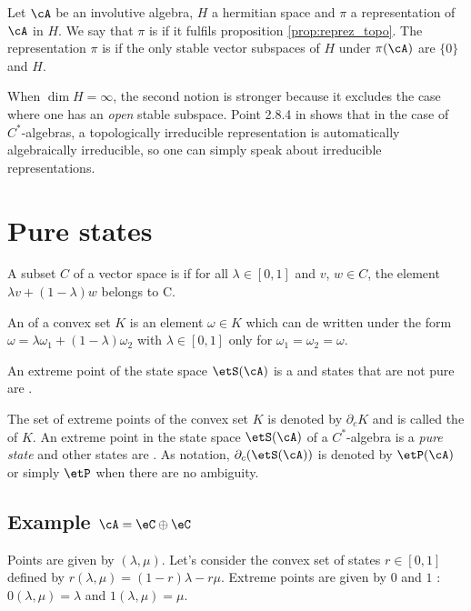 \begin{definition}
Let $\cA$ be an involutive algebra, $H$ a hermitian space and $\pi$ a representation of $\cA$ in $H$. We say that $\pi$ is  if it fulfils proposition \ref{prop:reprez_topo}. The representation $\pi$ is  if the only stable vector subspaces of $H$ under $\pi(\cA)$ are $\{0\}$ and $H$.
\end{definition}

When $\dim H=\infty$, the second notion is stronger because it excludes the case where one has an \emph{open} stable subspace. Point 2.8.4 in \cite{Dixmier} shows that in the case of $C^*$-algebras, a topologically irreducible representation is automatically algebraically irreducible, so one can simply speak about irreducible representations.

%
   \section{Pure states}
%


A subset $C$ of a vector space is  if for all $\lambda\in[0,1]$ and $v$, $w\in C$, the element $\lambda v+(1-\lambda)w$ belongs to C.

An  of a convex set $K$ is an element $\omega\in K$ which can de written under the form $\omega=\lambda\omega_1+(1-\lambda)\omega_2$ with $\lambda\in[0,1]$ only for $\omega_1=\omega_2=\omega$.

\begin{definition}
An extreme point of the state space $\etS(\cA)$ is a  and states that are not pure are .
\end{definition}

The set of extreme points of the convex set $K$ is denoted by $\partial_cK$ and is called the  of $K$.  An extreme point in the state space $\etS(\cA)$ of a $C^*$-algebra is a \emph{pure state} and other states are . As notation, $\partial_c(\etS(\cA))$ is denoted by $\etP(\cA)$ or simply $\etP$ when there are no ambiguity.

\subsection*{Example \texorpdfstring{$\cA=\eC\oplus\eC$}{A=C+C}}
 Points are given by $(\lambda,\mu)$. Let's consider the convex set of states $r\in[0,1]$ defined by $r(\lambda,\mu)=(1-r)\lambda-r\mu$.  Extreme points are given by $0$ and $1$ : $0(\lambda, \mu)=\lambda$ and $1(\lambda,\mu)=\mu$.

